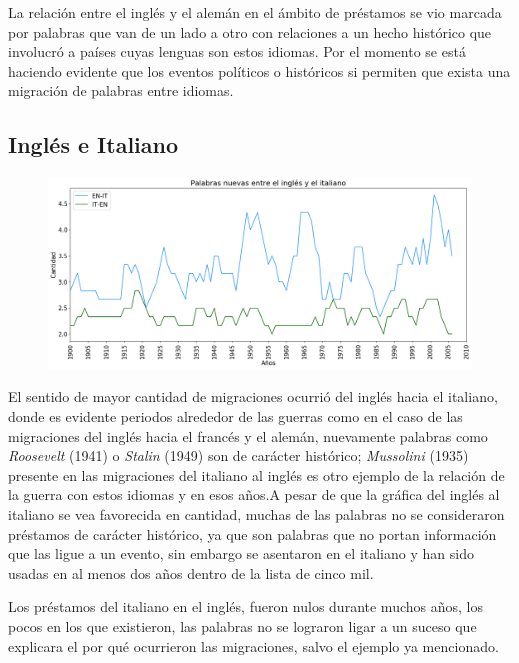 La relación entre el inglés y el alemán en el ámbito de préstamos se vio marcada por palabras que van de un lado a otro con relaciones a un hecho histórico que involucró a países cuyas lenguas son estos idiomas.  Por el momento se está haciendo evidente que los eventos políticos o históricos si permiten que exista una migración de palabras entre idiomas. 

\newpage
\subsection{Inglés e Italiano}

\begin{figure}[h!]
	\centering
	\includegraphics[scale=.38]{Cap_2/NC_3_S2_EN.png}
	\label{NC_EI}
	\caption{}
\end{figure}

El sentido de mayor cantidad de migraciones ocurrió del inglés hacia el italiano, donde es evidente periodos alrededor de las guerras como en el caso de las migraciones del inglés hacia el francés y el alemán,  nuevamente palabras como \textit{Roosevelt} (1941) o \textit{Stalin} (1949) son de carácter histórico; \textit{Mussolini} (1935)  presente en las migraciones del italiano al inglés es otro ejemplo de la relación de la guerra con estos idiomas y en esos años.A pesar de que la gráfica del inglés al italiano se vea favorecida en cantidad, muchas de las palabras no se consideraron préstamos de carácter histórico, ya que son palabras que no portan información que las ligue a un evento, sin embargo se asentaron en el italiano y han sido usadas en al menos dos años dentro de la lista de cinco mil. 

Los préstamos del italiano en el inglés, fueron nulos durante muchos años, los pocos en los que existieron, las palabras no se lograron  ligar a un suceso que explicara el por qué ocurrieron las migraciones,  salvo el ejemplo ya mencionado.

